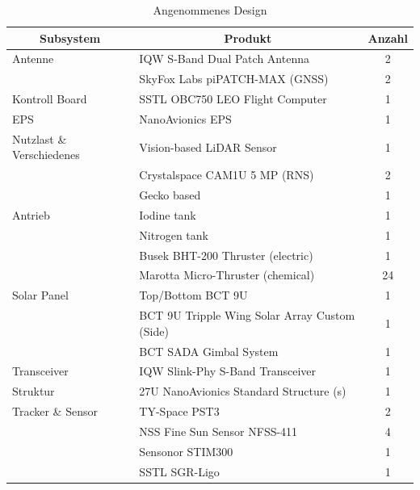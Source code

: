 				\begin{table}[!h]
				\centering
\begin{tabular}{|l|l|c|}
\hline
\multicolumn{1}{|c|}{Subsystem} & \multicolumn{1}{c|}{Produkt}    	            & Anzahl \\ \hline
Antenne                         & IQW S-Band Dual Patch Antenna                 & 2      \\ \hline
                                & SkyFox Labs piPATCH-MAX (GNSS)                & 2      \\ \hline
Kontroll Board                  & SSTL OBC750 LEO Flight Computer               & 1      \\ \hline
EPS                             & NanoAvionics EPS                              & 1      \\ \hline
Nutzlast \& Verschiedenes       & Vision-based LiDAR Sensor                     & 1      \\ \hline
                                & Crystalspace CAM1U 5 MP (RNS)                 & 2      \\ \hline
                                & Gecko based                                   & 1      \\ \hline
Antrieb                         & Iodine tank                                   & 1      \\ \hline
                                & Nitrogen tank                                 & 1      \\ \hline
                                & Busek BHT-200 Thruster (electric)             & 1      \\ \hline
                                & Marotta Micro-Thruster (chemical)             & 24     \\ \hline
Solar Panel                     & Top/Bottom BCT 9U                             & 1      \\ \hline
                                & BCT 9U Tripple Wing Solar Array Custom (Side) & 1      \\ \hline
                                & BCT SADA Gimbal System                        & 1      \\ \hline
Transceiver                     & IQW Slink-Phy S-Band Transceiver              & 1      \\ \hline
Struktur                        & 27U NanoAvionics Standard Structure (s)       & 1      \\ \hline
Tracker \& Sensor               & TY-Space PST3                                 & 2      \\ \hline
                                & NSS Fine Sun Sensor NFSS-411                  & 4      \\ \hline
                                & Sensonor STIM300                              & 1      \\ \hline
                                & SSTL SGR-Ligo                                 & 1      \\ \hline
\end{tabular}
\caption{Angenommenes Design \cite{Lettau.}}
\label{tab:cubesatdesign}
\end{table}
